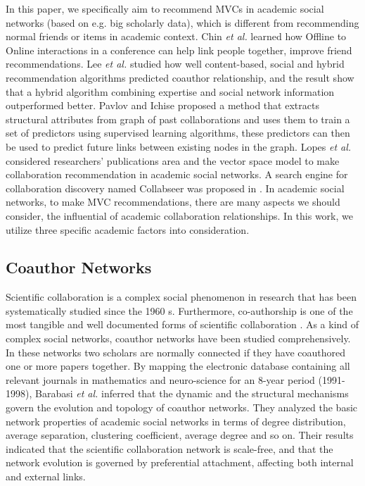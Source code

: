 \documentclass[10pt,journal,compsoc]{IEEEtran}
\begin{document}
In this paper, we specifically aim to recommend MVCs in academic social networks (based on e.g. big scholarly data), which is different from recommending normal friends or items in academic context. Chin \textit{et al.} \cite{chin2012linking} learned how Offline to Online interactions in a conference can help link people together, improve friend recommendations. Lee \textit{et al.} \cite{lee2011recommending} studied how well content-based, social and hybrid recommendation algorithms predicted coauthor relationship, and the result show that a hybrid algorithm combining expertise and social network information outperformed better. Pavlov and Ichise \cite{pavlov2007finding} proposed a method that extracts structural attributes from graph of past collaborations and uses them to train a set of predictors using supervised learning algorithms, these predictors can then be used to predict future links between existing nodes in the graph. Lopes \textit{et al.} \cite{Lopes:Colleboration} considered researchers' publications area and the vector space model to make collaboration recommendation in academic social networks. A search engine for collaboration discovery named Collabseer was proposed in \cite{Chen:CollabSeer}. In academic social networks, to make MVC recommendations, there are many aspects we should consider, the influential of academic collaboration relationships. In this work, we utilize three specific academic factors into consideration.


\subsection{Coauthor Networks}
Scientific collaboration is a complex social phenomenon in research that has been systematically studied since the 1960 s. Furthermore, co-authorship is one of the most tangible and well documented forms of scientific collaboration \cite{glanzel2005analysing}. As a kind of complex social networks, coauthor networks have been studied comprehensively. In these networks two scholars are normally connected if they have coauthored one or more papers together. By mapping the electronic database containing all relevant journals in mathematics and neuro-science for an 8-year period (1991-1998), Barabasi \textit{et al.} \cite{Barabasi:evolution} inferred that the dynamic and the structural mechanisms govern the evolution and topology of coauthor networks. They analyzed the basic network properties of academic social networks in terms of  degree distribution, average separation, clustering coefficient, average degree and so on. Their results indicated that the scientific collaboration network is scale-free, and that the network evolution is governed by preferential attachment, affecting both internal and external links.
\end{document}
